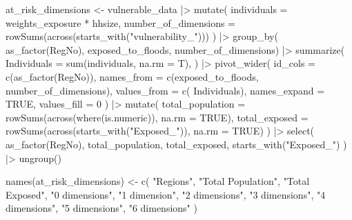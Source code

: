 \documentclass[
  letterpaper,
  DIV=11,
  numbers=noendperiod]{scrartcl}
\newenvironment{Shaded}{}{}
\newcommand{\AttributeTok}[1]{\textcolor[rgb]{0.84,0.23,0.29}{#1}}
\newcommand{\ConstantTok}[1]{\textcolor[rgb]{0.00,0.36,0.77}{#1}}
\newcommand{\DecValTok}[1]{\textcolor[rgb]{0.00,0.36,0.77}{#1}}
\newcommand{\FunctionTok}[1]{\textcolor[rgb]{0.44,0.26,0.76}{#1}}
\newcommand{\NormalTok}[1]{\textcolor[rgb]{0.14,0.16,0.18}{#1}}
\newcommand{\OtherTok}[1]{\textcolor[rgb]{0.44,0.26,0.76}{#1}}
\newcommand{\SpecialCharTok}[1]{\textcolor[rgb]{0.00,0.36,0.77}{#1}}
\newcommand{\StringTok}[1]{\textcolor[rgb]{0.01,0.18,0.38}{#1}}
\begin{document}
\begin{Shaded}
\begin{Highlighting}[]
\NormalTok{at\_risk\_dimensions }\OtherTok{\textless{}{-}}\NormalTok{ vulnerable\_data }\SpecialCharTok{|\textgreater{}}
  \FunctionTok{mutate}\NormalTok{(}
    \AttributeTok{individuals =}\NormalTok{ weights\_exposure }\SpecialCharTok{*}\NormalTok{ hhsize,}
    \AttributeTok{number\_of\_dimensions =} \FunctionTok{rowSums}\NormalTok{(}\FunctionTok{across}\NormalTok{(}\FunctionTok{starts\_with}\NormalTok{(}\StringTok{"vulnerability\_"}\NormalTok{)))}
\NormalTok{    ) }\SpecialCharTok{|\textgreater{}} 
  \FunctionTok{group\_by}\NormalTok{(}
    \FunctionTok{as\_factor}\NormalTok{(RegNo), }
\NormalTok{    exposed\_to\_floods, }
\NormalTok{    number\_of\_dimensions) }\SpecialCharTok{|\textgreater{}} 
  \FunctionTok{summarize}\NormalTok{(}
    \AttributeTok{Individuals =} \FunctionTok{sum}\NormalTok{(individuals, }\AttributeTok{na.rm =}\NormalTok{ T),}
\NormalTok{  ) }\SpecialCharTok{|\textgreater{}} 
  \FunctionTok{pivot\_wider}\NormalTok{(}
    \AttributeTok{id\_cols =} \FunctionTok{c}\NormalTok{(}\StringTok{\textasciigrave{}}\AttributeTok{as\_factor(RegNo)}\StringTok{\textasciigrave{}}\NormalTok{),}
    \AttributeTok{names\_from =} \FunctionTok{c}\NormalTok{(exposed\_to\_floods, number\_of\_dimensions),}
    \AttributeTok{values\_from =} \FunctionTok{c}\NormalTok{(}
\NormalTok{      Individuals),}
    \AttributeTok{names\_expand =} \ConstantTok{TRUE}\NormalTok{,}
    \AttributeTok{values\_fill =} \DecValTok{0}
\NormalTok{  ) }\SpecialCharTok{|\textgreater{}} 
  \FunctionTok{mutate}\NormalTok{(}
    \AttributeTok{total\_population =} \FunctionTok{rowSums}\NormalTok{(}\FunctionTok{across}\NormalTok{(}\FunctionTok{where}\NormalTok{(is.numeric)), }\AttributeTok{na.rm =} \ConstantTok{TRUE}\NormalTok{),}
    \AttributeTok{total\_exposed =} \FunctionTok{rowSums}\NormalTok{(}\FunctionTok{across}\NormalTok{(}\FunctionTok{starts\_with}\NormalTok{(}\StringTok{"Exposed\_"}\NormalTok{)), }\AttributeTok{na.rm =} \ConstantTok{TRUE}\NormalTok{)}
\NormalTok{  ) }\SpecialCharTok{|\textgreater{}} 
  \FunctionTok{select}\NormalTok{(}
    \StringTok{\textasciigrave{}}\AttributeTok{as\_factor(RegNo)}\StringTok{\textasciigrave{}}\NormalTok{,}
\NormalTok{    total\_population,}
\NormalTok{    total\_exposed,}
    \FunctionTok{starts\_with}\NormalTok{(}\StringTok{"Exposed\_"}\NormalTok{)}
\NormalTok{  ) }\SpecialCharTok{|\textgreater{}} 
  \FunctionTok{ungroup}\NormalTok{()}

\FunctionTok{names}\NormalTok{(at\_risk\_dimensions) }\OtherTok{\textless{}{-}} \FunctionTok{c}\NormalTok{(}
  \StringTok{"Regions"}\NormalTok{,}
  \StringTok{"Total Population"}\NormalTok{,}
  \StringTok{"Total Exposed"}\NormalTok{,}
  \StringTok{"0 dimensions"}\NormalTok{,}
  \StringTok{"1 dimension"}\NormalTok{,}
  \StringTok{"2 dimensions"}\NormalTok{,}
  \StringTok{"3 dimensions"}\NormalTok{,}
  \StringTok{"4 dimensions"}\NormalTok{,}
  \StringTok{"5 dimensions"}\NormalTok{,}
  \StringTok{"6 dimensions"}
\NormalTok{)}


\end{Highlighting}
\end{Shaded}
\end{document}
